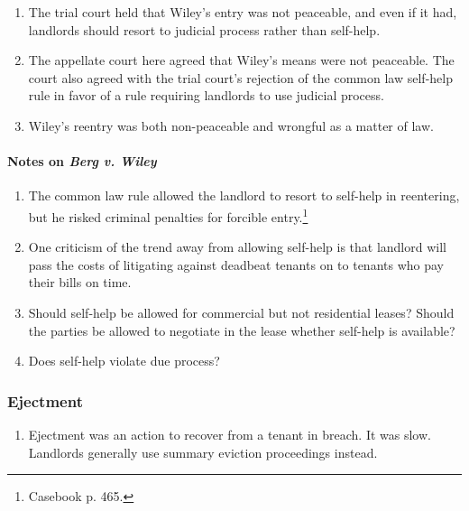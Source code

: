 \begin{enumerate}
\begin{enumerate}
\begin{enumerate}
            \item The trial court held that Wiley's entry was not peaceable, 
            and even if it had, landlords should resort to judicial process 
            rather than self-help.
            \item The appellate court here agreed that Wiley's means were not 
            peaceable. The court also agreed with the trial court's rejection 
            of the common law self-help rule in favor of a rule requiring 
            landlords to use judicial process.
            \item Wiley's reentry was both non-peaceable and wrongful as a 
            matter of law.
        \end{enumerate}
    \end{enumerate}
\end{enumerate}

\paragraph{Notes on \emph{Berg v. Wiley}}

\begin{enumerate}
    \item The common law rule allowed the landlord to resort to self-help in 
    reentering, but he risked criminal penalties for forcible 
    entry.\footnote{Casebook p. 465.}
    \item One criticism of the trend away from allowing self-help is that 
    landlord will pass the costs of litigating against deadbeat tenants on to 
    tenants who pay their bills on time.
    \item Should self-help be allowed for commercial but not residential 
    leases? Should the parties be allowed to negotiate in the lease whether 
    self-help is available?
    \item Does self-help violate due process?
\end{enumerate}

\subsubsection{Ejectment}

\begin{enumerate}
    \item Ejectment was an action to recover from a tenant in breach. It was 
    slow. Landlords generally use summary eviction proceedings instead.
\end{enumerate}

